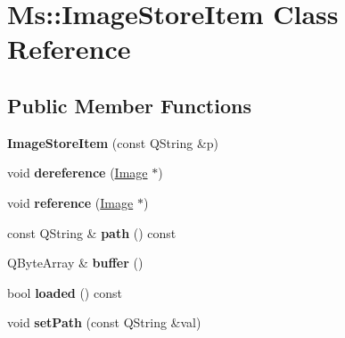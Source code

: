 \hypertarget{class_ms_1_1_image_store_item}{}\section{Ms\+:\+:Image\+Store\+Item Class Reference}
\label{class_ms_1_1_image_store_item}
\subsection*{Public Member Functions}
\begin{DoxyCompactItemize}
\item 
\mbox{\label{class_ms_1_1_image_store_item_a2f108f641b8ff6d3c706915a34e1c2a8}} 
{\bfseries Image\+Store\+Item} (const Q\+String \&p)
\item 
\mbox{\label{class_ms_1_1_image_store_item_a1aafa44017fab50dda5233d011c0d4c3}} 
void {\bfseries dereference} (\hyperlink{class_ms_1_1_image}{Image} $\ast$)
\item 
\mbox{\label{class_ms_1_1_image_store_item_a6f38b9e8c8005f39cf7ae53fa23e7bfd}} 
void {\bfseries reference} (\hyperlink{class_ms_1_1_image}{Image} $\ast$)
\item 
\mbox{\label{class_ms_1_1_image_store_item_a007ba0e105892741f52fdb198bfc70ca}} 
const Q\+String \& {\bfseries path} () const
\item 
\mbox{\label{class_ms_1_1_image_store_item_a9ea1ffbe538372052ad8eb9355988bd2}} 
Q\+Byte\+Array \& {\bfseries buffer} ()
\item 
\mbox{\label{class_ms_1_1_image_store_item_ad66fa463b84862c88ebed6daa7cbbf67}} 
bool {\bfseries loaded} () const
\item 
\mbox{\label{class_ms_1_1_image_store_item_af6f6f2f8195eed403d7b9f63c6a4d962}} 
void {\bfseries set\+Path} (const Q\+String \&val)
\item 
\mbox{\label{class_ms_1_1_image_store_item_a4082d59331e561a4b995ee05bd686478}} 

\end{DoxyCompactItemize}

